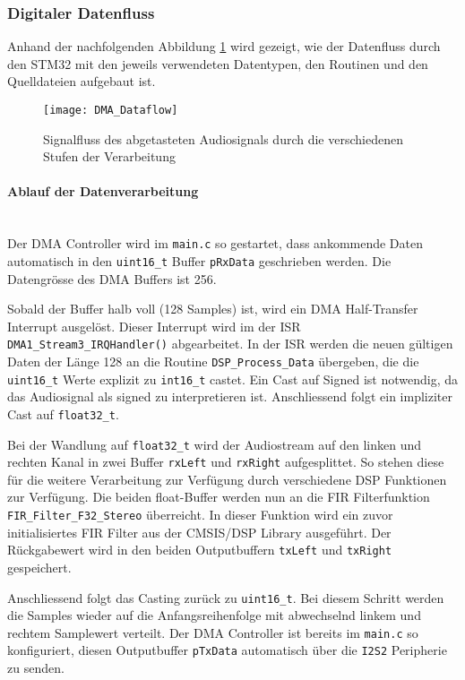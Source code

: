 \subsubsection{Digitaler Datenfluss}
\label{sec:Dataflow}

Anhand der nachfolgenden Abbildung \ref{pic:DMA_Dataflow} wird gezeigt, wie der Datenfluss durch den STM32 mit den jeweils verwendeten Datentypen, den Routinen und den Quelldateien aufgebaut ist.

\begin{figure}[H]
	\centering
	\texttt{[image: DMA\_Dataflow]}
	\caption{Signalfluss des abgetasteten Audiosignals durch die verschiedenen Stufen der Verarbeitung}
	\label{pic:DMA_Dataflow}
\end{figure}

\paragraph{Ablauf der Datenverarbeitung}\vspace{-0.3cm}\\
Der DMA Controller wird im \texttt{main.c} so gestartet, dass ankommende Daten automatisch in den \texttt{uint16\_t} Buffer \texttt{pRxData} geschrieben werden. Die Datengrösse des DMA Buffers ist 256. 

Sobald der Buffer halb voll (128 Samples) ist, wird ein DMA Half-Transfer Interrupt ausgelöst.
Dieser Interrupt wird im der ISR \texttt{DMA1\_Stream3\_IRQHandler()} abgearbeitet. 
In der ISR werden die neuen gültigen Daten der Länge 128 an die Routine \texttt{DSP\_Process\_Data} übergeben, die die \texttt{uint16\_t} Werte explizit zu \texttt{int16\_t} castet. Ein Cast auf Signed ist notwendig, da das Audiosignal als signed zu interpretieren ist. Anschliessend folgt ein impliziter Cast auf \texttt{float32\_t}.

Bei der Wandlung auf \texttt{float32\_t} wird der Audiostream auf den linken und rechten Kanal in zwei Buffer \texttt{rxLeft} und \texttt{rxRight} aufgesplittet.
So stehen diese für die weitere Verarbeitung zur Verfügung durch verschiedene DSP Funktionen zur Verfügung.
Die beiden float-Buffer werden nun an die FIR Filterfunktion \texttt{FIR\_Filter\_F32\_Stereo} überreicht. In dieser Funktion wird ein zuvor initialisiertes FIR Filter aus der CMSIS/DSP Library ausgeführt.
Der Rückgabewert wird in den beiden Outputbuffern \texttt{txLeft} und \texttt{txRight} gespeichert.

Anschliessend folgt das Casting zurück zu \texttt{uint16\_t}. Bei diesem Schritt werden die Samples wieder auf die Anfangsreihenfolge mit abwechselnd linkem und rechtem Samplewert verteilt.
Der DMA Controller ist bereits im \texttt{main.c} so konfiguriert, diesen Outputbuffer \texttt{pTxData} automatisch über die \texttt{I2S2} Peripherie zu senden.

